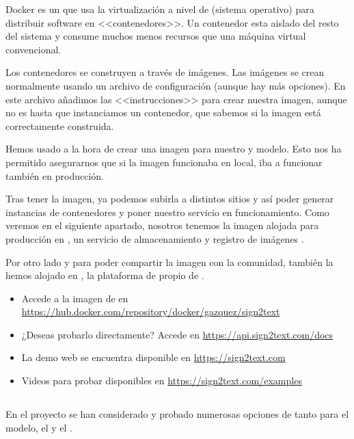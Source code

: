 Docker es un  que usa la virtualización a nivel de  (sistema operativo) para distribuir software en <<contenedores>>. Un contenedor esta aislado del resto del sistema y consume muchos menos recursos que una máquina virtual convencional.

Los contenedores se construyen a través de imágenes. Las imágenes se crean normalmente usando un archivo de configuración  (aunque hay más opciones). En este archivo añadimos las <<instrucciones>> para crear nuestra imagen, aunque no es hasta que instanciamos un contenedor, que sabemos si la imagen está correctamente construida.

Hemos usado  a la hora de crear una imagen para nuestro  y modelo. Esto nos ha permitido asegurarnos que si la imagen funcionaba en local, iba a funcionar también en producción.

Tras tener la imagen, ya podemos subirla a distintos sitios y así poder generar instancias de contenedores y poner nuestro servicio en funcionamiento. Como veremos en el siguiente apartado, nosotros tenemos la imagen alojada para producción en , un servicio de almacenamiento y registro de imágenes .

Por otro lado y para poder compartir la imagen con la comunidad, también la hemos alojado en , la plataforma de  propio de .

\begin{itemize}
  \item Accede a la imagen de  en \url{https://hub.docker.com/repository/docker/gazquez/sign2text}
  \item ¿Deseas probarlo directamente? Accede en \url{https://api.sign2text.com/docs}
  \item La demo web se encuentra disponible en \url{https://sign2text.com}
  \item Videos para probar disponibles en \url{https://sign2text.com/examples}
\end{itemize}

\subsection{}

En el proyecto se han considerado y probado numerosas opciones de  tanto para el modelo, el  y el .

